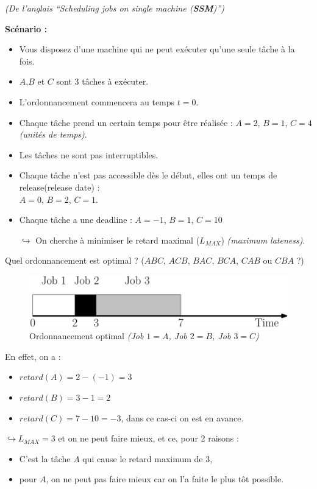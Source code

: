 \documentclass[12pt]{article}
\begin{document}
\begin{flushright}
\textit{(De l'anglais ``Scheduling jobs on single machine (\textbf{SSM})'')}
\end{flushright}
\textbf{Scénario :}
\begin{itemize}
\item Vous disposez d'une machine qui ne peut exécuter qu'une seule tâche à la
fois.
\item $A$,$B$ et $C$ sont $3$ tâches à exécuter.
\item L'ordonnancement commencera au temps $t = 0$.
\item Chaque tâche prend un certain temps pour être réalisée : $A = 2$, $B = 1$,
$C = 4$ \textit{(unités de temps)}.
\item Les tâches ne sont pas interruptibles.
\item Chaque tâche n'est pas accessible dès le début, elles ont un temps de
release(release date) :\\ $A = 0$, $B = 2$, $C = 1$.
\item Chaque tâche a une deadline : $A = -1$, $B = 1$, $C = 10$
\item[$\hookrightarrow$] On cherche à minimiser le retard maximal ($L_{MAX}$)
\textit{(maximum lateness)}.
\end{itemize}

Quel ordonnancement est optimal ? ($ABC$, $ACB$, $BAC$, $BCA$, $CAB$ ou $CBA$ ?)

\begin{figure}[h!]
    \begin{center}
    \includegraphics[scale=0.2]{ordo.pdf}
    \caption{Ordonnancement optimal \textit{(Job $1 = A$, Job $2 = B$,
    Job $3 = C$)}}
    \end{center}
\end{figure}
\noindent En effet, on a :
\begin{itemize}
\item $retard(A) = 2 - (-1) = 3$
\item $retard(B) = 3 - 1 = 2$
\item $retard(C) = 7 - 10 = -3$, dans ce cas-ci on est en avance.
\end{itemize}

$\hookrightarrow L_{MAX} = 3$ et on ne peut faire mieux, et ce, pour 2 raisons :
\begin{itemize}
\item C'est la tâche $A$ qui cause le retard maximum de $3$,
\item pour $A$, on ne peut pas faire mieux car on l'a faite le plus tôt
possible.
\end{itemize}
\end{document}
